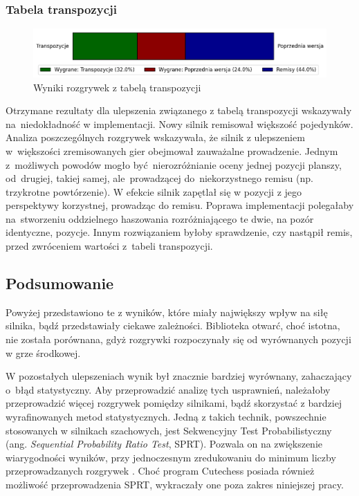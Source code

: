 \subsubsection{Tabela transpozycji}
\begin{figure}[ht]
    \centering
    \includegraphics[width=1\linewidth]{rozdzialy/rozdzial03/1_porownanie-wersji-silnika/rysunki/wyniki-transpozycje}
    \caption{Wyniki rozgrywek z tabelą transpozycji}
    \label{fig:wyniki-transpozycje}
\end{figure}
Otrzymane rezultaty dla ulepszenia związanego z tabelą transpozycji wskazywały na~niedokładność w implementacji.
Nowy silnik remisował większość pojedynków.
Analiza poszczególnych rozgrywek wskazywała, że silnik z ulepszeniem w~większości zremisowanych gier obejmował zauważalne prowadzenie.
Jednym z~możliwych powodów mogło być~nierozróżnianie oceny jednej pozycji planszy, od~drugiej, takiej samej, ale~prowadzącej do~niekorzystnego remisu (np. trzykrotne powtórzenie).
W efekcie silnik zapętlał się w pozycji z jego perspektywy korzystnej, prowadząc do remisu.
Poprawa implementacji polegałaby na~stworzeniu oddzielnego haszowania rozróżniającego te dwie, na pozór identyczne, pozycje.
Innym rozwiązaniem byłoby sprawdzenie, czy nastąpił remis, przed zwróceniem wartości z~tabeli transpozycji.


\subsection{Podsumowanie}\label{subsec:podsumowanie}
Powyżej przedstawiono te z wyników, które miały największy wpływ na siłę silnika, bądź przedstawiały ciekawe zależności.
Biblioteka otwarć, choć istotna, nie została porównana, gdyż rozgrywki rozpoczynały się od wyrównanych pozycji w grze środkowej.

W pozostałych ulepszeniach wynik był znacznie bardziej wyrównany, zahaczający o~błąd statystyczny.
Aby przeprowadzić analizę tych usprawnień, należałoby przeprowadzić więcej rozgrywek pomiędzy silnikami, bądź skorzystać z bardziej wyrafinowanych metod statystycznych.
Jedną z takich technik, powszechnie stosowanych w silnikach szachowych, jest Sekwencyjny Test Probabilistyczny (ang. \emph{Sequential Probability Ratio Test}, SPRT).
Pozwala on na zwiększenie wiarygodności wyników, przy jednoczesnym zredukowaniu do minimum liczby przeprowadzanych rozgrywek \cite*{wiki-sprt}.
Choć program Cutechess posiada również możliwość przeprowadzenia SPRT, wykraczały one poza zakres niniejszej pracy.


